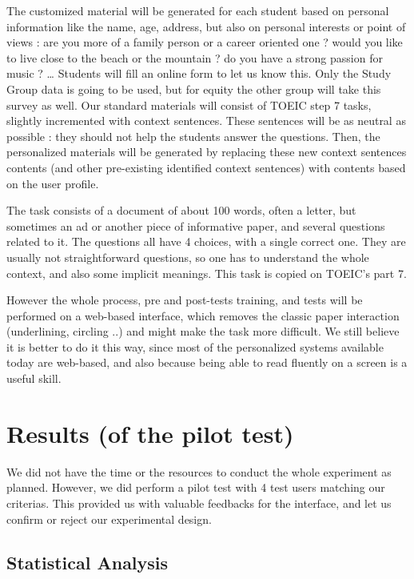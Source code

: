 \documentclass[a4paper,12pt]{article}
\begin{document}
The customized material will be generated for each student based on personal information like the name, age, address, but also on personal interests or point of views : are you more of a family person or a career oriented one ? would you like to live close to the beach or the mountain ? do you have a strong passion for music ? … Students will fill an online form to let us know this. Only the Study Group data is going to be used, but for equity the other group will take this survey as well. Our standard materials will consist of TOEIC step 7 tasks, slightly incremented with context sentences. These sentences will be as neutral as possible : they should not help the students answer the questions. Then, the personalized materials will be generated by replacing these new context sentences contents (and other pre-existing identified context sentences) with contents based on the user profile.

The task consists of a document of about 100 words, often a letter, but sometimes an ad or another piece of informative paper, and several questions related to it. The questions all have 4 choices, with a single correct one. They are usually not straightforward questions, so one has to understand the whole context, and also some implicit meanings. This task is copied on TOEIC's part 7.

However the whole process, pre and post-tests training, and tests will be performed on a web-based interface, which removes the classic paper interaction (underlining, circling ..) and might make the task more difficult. We still believe it is better to do it this way, since most of the personalized systems available today are web-based, and also because being able to read fluently on a screen is a useful skill.


\section{Results (of the pilot test)}

We did not have the time or the resources to conduct the whole experiment as planned. However, we did perform a pilot test with 4 test users matching our criterias. This provided us with valuable feedbacks for the interface, and let us confirm or reject our experimental design.

\subsection{Statistical Analysis}
\end{document}
